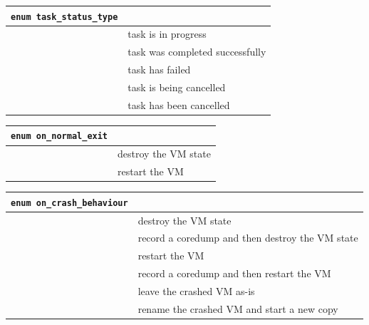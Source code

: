 \vspace{1cm}
\begin{longtable}{|ll|}
\hline
{\tt enum task\_status\_type} & \\
\hline
\hspace{0.5cm}{\tt pending} & task is in progress \\
\hspace{0.5cm}{\tt success} & task was completed successfully \\
\hspace{0.5cm}{\tt failure} & task has failed \\
\hspace{0.5cm}{\tt cancelling} & task is being cancelled \\
\hspace{0.5cm}{\tt cancelled} & task has been cancelled \\
\hline
\end{longtable}

\vspace{1cm}
\begin{longtable}{|ll|}
\hline
{\tt enum on\_normal\_exit} & \\
\hline
\hspace{0.5cm}{\tt destroy} & destroy the VM state \\
\hspace{0.5cm}{\tt restart} & restart the VM \\
\hline
\end{longtable}

\vspace{1cm}
\begin{longtable}{|ll|}
\hline
{\tt enum on\_crash\_behaviour} & \\
\hline
\hspace{0.5cm}{\tt destroy} & destroy the VM state \\
\hspace{0.5cm}{\tt coredump\_and\_destroy} & record a coredump and then destroy the VM state \\
\hspace{0.5cm}{\tt restart} & restart the VM \\
\hspace{0.5cm}{\tt coredump\_and\_restart} & record a coredump and then restart the VM \\
\hspace{0.5cm}{\tt preserve} & leave the crashed VM as-is \\
\hspace{0.5cm}{\tt rename\_restart} & rename the crashed VM and start a new copy \\
\hline
\end{longtable}

